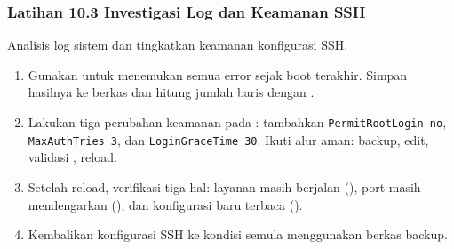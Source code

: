 \subsubsection*{Latihan 10.3 Investigasi Log dan Keamanan SSH}
Analisis log sistem dan tingkatkan keamanan konfigurasi SSH.
\begin{enumerate}
    \item Gunakan  untuk menemukan semua error sejak boot terakhir. Simpan hasilnya ke berkas dan hitung jumlah baris dengan .
    \item Lakukan tiga perubahan keamanan pada : tambahkan \texttt{PermitRootLogin no}, \texttt{MaxAuthTries 3}, dan \texttt{LoginGraceTime 30}. Ikuti alur aman: backup, edit, validasi , reload.
    \item Setelah reload, verifikasi tiga hal: layanan masih berjalan (), port masih mendengarkan (), dan konfigurasi baru terbaca ().
\item Kembalikan konfigurasi SSH ke kondisi semula menggunakan berkas backup.
\end{enumerate}

